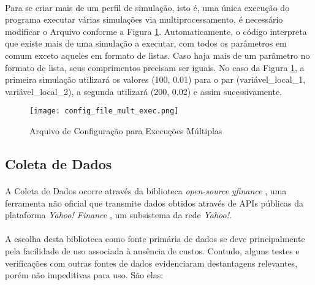 \paragraph{} Para se criar mais de um perfil de simulação, isto é, uma única execução do programa executar várias simulações via multiprocessamento, é necessário modificar o Arquivo conforme a Figura \ref{fig:102}. Automaticamente, o código interpreta que existe mais de uma simulação a executar, com todos os parâmetros em comum exceto aqueles em formato de listas. Caso haja mais de um parâmetro no formato de lista, seus comprimentos precisam ser iguais. No caso da Figura \ref{fig:102}, a primeira simulação utilizará os valores (100, 0.01) para o par (variável\_local\_1, variável\_local\_2), a segunda utilizará (200, 0.02) e assim sucessivamente.

\begin{figure}[!htb]
    \texttt{[image: config\_file\_mult\_exec.png]}
    \centering
    \caption{Arquivo de Configuração para Execuções Múltiplas}
    \label{fig:102}
\end{figure}



\FloatBarrier
\subsection{Coleta de Dados}
\label{coleta_de_dados}

\paragraph{} A Coleta de Dados ocorre através da biblioteca \textit{open-source} \textit{yfinance} \cite{yfinance}, uma ferramenta não oficial que transmite dados obtidos através de APIs públicas da plataforma \textit{Yahoo! Finance} \cite{yahoo_finance}, um subsistema da rede \textit{Yahoo!}.

\paragraph{} A escolha desta biblioteca como fonte primária de dados se deve principalmente pela facilidade de uso associada à ausência de custos. Contudo, alguns testes e verificações com outras fontes de dados evidenciaram destantagens relevantes, porém não impeditivas para uso. São elas:

